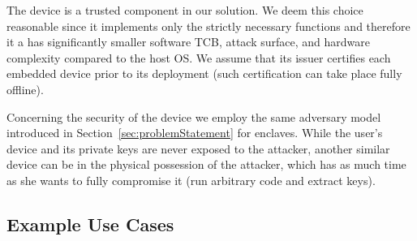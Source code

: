 \ifusenix
\vspace{-15pt}
\else
\fi
{}
The \device device is a trusted component in our solution. We deem this choice reasonable since it implements only the strictly necessary functions and therefore it a has significantly smaller software TCB, attack surface, and hardware complexity compared to the host OS. 
We assume that its issuer certifies each embedded device prior to its deployment (such certification can take place fully offline). %

Concerning the security of the \device device we employ the same adversary model introduced in Section~\ref{sec:problemStatement} for enclaves. While the user's device and its private keys are never exposed to the attacker, another similar device can be in the physical possession of the attacker, which has as much time as she wants to fully compromise it (run arbitrary code and extract keys). %



\subsection{Example Use Cases}
\label{sec:use-cases}

% 


